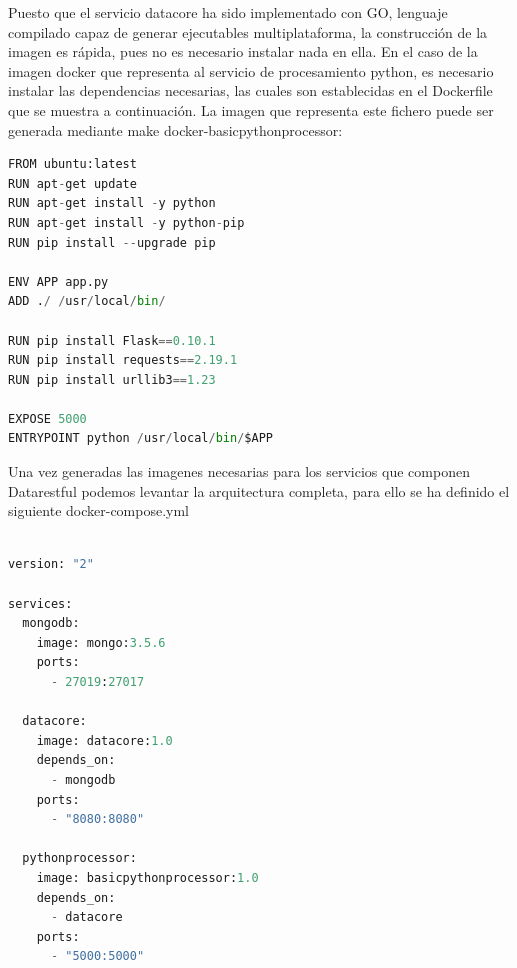 \documentclass[a4paper,11pt]{book}
\begin{document}
Puesto que el servicio datacore ha sido implementado con GO, lenguaje compilado capaz de generar ejecutables multiplataforma, la construcción de la imagen es rápida, pues no es necesario instalar nada en ella. En el caso de la imagen docker que representa al servicio de procesamiento python, es necesario instalar las dependencias  necesarias, las cuales son establecidas en el Dockerfile que se muestra a continuación. La imagen que representa este fichero puede ser generada mediante make docker-basicpythonprocessor:

\begin{lstlisting}[language=python,caption={basicPythonProcessor/Dockerfile}]
FROM ubuntu:latest
RUN apt-get update
RUN apt-get install -y python
RUN apt-get install -y python-pip
RUN pip install --upgrade pip

ENV APP app.py
ADD ./ /usr/local/bin/

RUN pip install Flask==0.10.1
RUN pip install requests==2.19.1
RUN pip install urllib3==1.23

EXPOSE 5000
ENTRYPOINT python /usr/local/bin/$APP
\end{lstlisting}

Una vez generadas las imagenes necesarias para los servicios que componen Datarestful podemos levantar la arquitectura completa, para ello se ha definido el siguiente docker-compose.yml


\begin{lstlisting}[language=python,caption={docker-compose.yml}]

version: "2"

services:
  mongodb:
    image: mongo:3.5.6
    ports:
      - 27019:27017

  datacore:
    image: datacore:1.0
    depends_on:
      - mongodb
    ports:
      - "8080:8080"

  pythonprocessor:
    image: basicpythonprocessor:1.0
    depends_on:
      - datacore
    ports:
      - "5000:5000"
\end{lstlisting}
\end{document}
